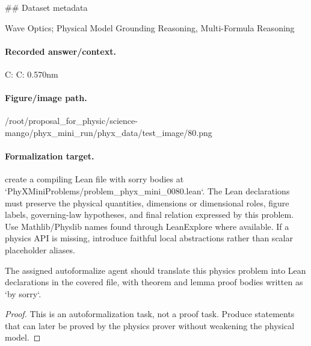 \#\# Dataset metadata

Wave Optics; Physical Model Grounding Reasoning, Multi-Formula Reasoning

\paragraph{Recorded answer/context.}
C: C: 0.570nm

\paragraph{Figure/image path.}
/root/proposal\_for\_physic/science-mango/phyx\_mini\_run/phyx\_data/test\_image/80.png

\paragraph{Formalization target.}
create a compiling Lean file with sorry bodies at `PhyXMiniProblems/problem\_phyx\_mini\_0080.lean`. The Lean declarations must preserve the physical quantities, dimensions or dimensional roles, figure labels, governing-law hypotheses, and final relation expressed by this problem.
Use Mathlib/Physlib names found through LeanExplore where available. If a physics API is missing, introduce faithful local abstractions rather than scalar placeholder aliases.

\begin{theorem}
\label{thm:physics:phyx_mini_0080:target}
The assigned autoformalize agent should translate this physics problem into Lean declarations in the covered file, with theorem and lemma proof bodies written as `by sorry`.
\end{theorem}
\begin{proof}
This is an autoformalization task, not a proof task. Produce statements that can later be proved by the physics prover without weakening the physical model.
\end{proof}

